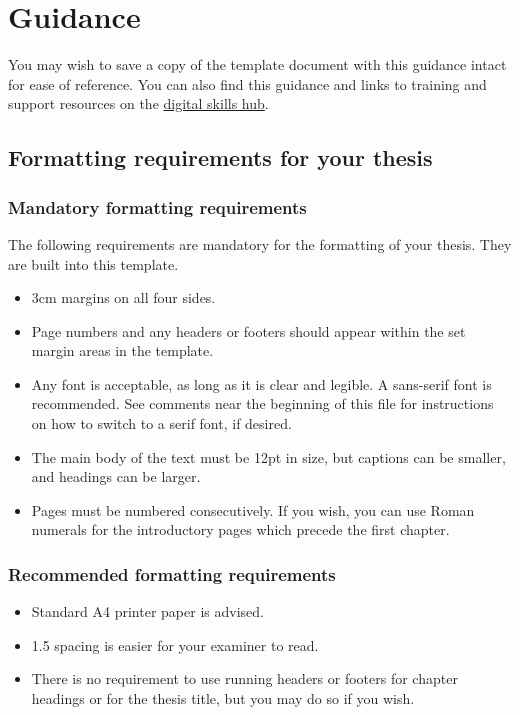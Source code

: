 \documentclass[12pt,oneside]{book} %
\begin{document}
 
\chapter{Guidance}
\label{chap:Guidance}
You may wish to save a copy of the template document with this guidance intact for ease of reference. You can also find this guidance and links to training and support resources on the \href{https://cranfield.sharepoint.com/sites/Digital-Skills/SitePages/Thesis-EPA-templates.aspx}{digital skills hub}.

\section{Formatting requirements for your thesis}\label{sec:FormattingRequirements}

\subsection{Mandatory formatting requirements}\label{sec:MandatoryFormatting}
The following requirements are mandatory for the formatting of your thesis. They are built into this template.
\begin{itemize}
\item 3cm margins on all four sides. 
\item Page numbers and any headers or footers should appear within the set margin areas in the template.
\item Any font is acceptable, as long as it is clear and legible. A sans-serif font is recommended. See comments near the beginning of this file for instructions on how to switch to a serif font, if desired.
\item The main body of the text must be 12pt in size, but captions can be smaller, and headings can be larger.
\item Pages must be numbered consecutively. If you wish, you can use Roman numerals for the introductory pages which precede the first chapter.
\end{itemize}

\subsection{Recommended formatting requirements}\label{sec:RecommendedFormatting}
\begin{itemize}
\item Standard A4 printer paper is advised.
\item 1.5 spacing is easier for your examiner to read.
\item There is no requirement to use running headers or footers for chapter headings or for the thesis title, but you may do so if you wish.
\end{itemize}
\end{document}
